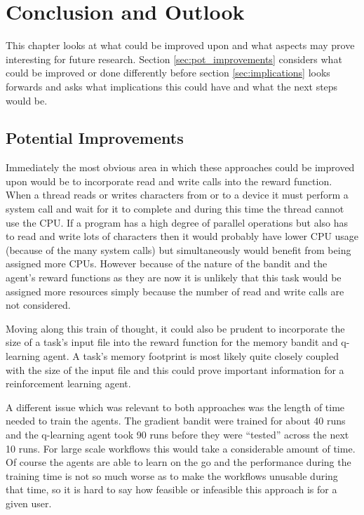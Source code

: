 
\cleardoublepage
\chapter{Conclusion and Outlook}
\label{cha:conclusion}

This chapter looks at what could be improved upon and what aspects may prove interesting for future research. Section \ref{sec:pot_improvements} considers what could be improved or done differently before section \ref{sec:implications} looks forwards and asks what implications this could have and what the next steps would be.

\section{Potential Improvements}
\label{sec:pot_improvement}

Immediately the most obvious area in which these approaches could be improved upon would be to incorporate read and write calls into the reward function. When a thread reads or writes characters from or to a device it must perform a system call and wait for it to complete and during this time the thread cannot use the CPU. If a program has a high degree of parallel operations but also has to read and write lots of characters then it would probably have lower CPU usage (because of the many system calls) but simultaneously would benefit from being assigned more CPUs. However because of the nature of the bandit and the agent’s reward functions as they are now it is unlikely that this task would be assigned more resources simply because the number of read and write calls are not considered.

Moving along this train of thought, it could also be prudent to incorporate the size of a task’s input file into the reward function for the memory bandit and q-learning agent. A task’s memory footprint is most likely quite closely coupled with the size of the input file and this could prove important information for a reinforcement learning agent.

A different issue which was relevant to both approaches was the length of time needed to train the agents. The gradient bandit were trained for about 40 runs and the q-learning agent took 90 runs before they were “tested” across the next 10 runs. For large scale workflows this would take a considerable amount of time. Of course the agents are able to learn on the go and the performance during the training time is not so much worse as to make the workflows unusable during that time, so it is hard to say how feasible or infeasible this approach is for a given user.

